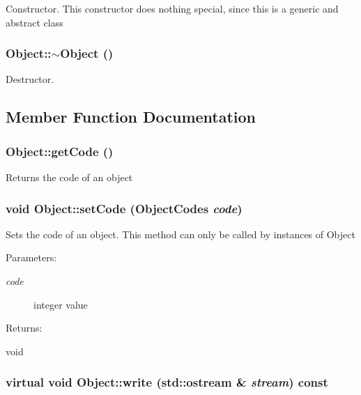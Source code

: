 Constructor. This constructor does nothing special, since this is a generic and abstract class 
\subsubsection{\setlength{\rightskip}{0pt plus 5cm}Object::$\sim$Object ()\hspace{0.3cm}{\tt  [virtual]}}\label{classObject_a1}


Destructor. 

\subsection{Member Function Documentation}
\subsubsection{ Object::get\-Code ()\hspace{0.3cm}{\tt  [inline]}}\label{classObject_a2}


Returns the code of an object 
\subsubsection{\setlength{\rightskip}{0pt plus 5cm}void Object::set\-Code ({\bf Object\-Codes} {\em code})\hspace{0.3cm}{\tt  [inline, protected]}}\label{classObject_b0}


Sets the code of an object. This method can only be called by instances of Object \begin{Desc}
\item[Parameters: ]\par
\begin{description}
\item[{\em 
code}]integer value \end{description}
\end{Desc}
\begin{Desc}
\item[Returns: ]\par
void \end{Desc}
\subsubsection{\setlength{\rightskip}{0pt plus 5cm}virtual void Object::write (std::ostream \& {\em stream}) const\hspace{0.3cm}{\tt  [inline, virtual]}}\label{classObject_a3}


